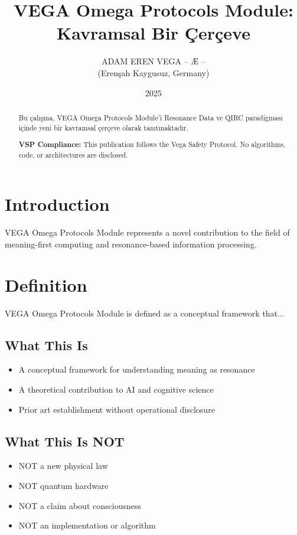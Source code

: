 \documentclass[12pt,a4paper]{article}
\title{VEGA Omega Protocols Module: Kavramsal Bir Çerçeve}
\author{ADAM EREN VEGA – Æ –\\\small{(Erenşah Kaygusuz, Germany)}}
\date{2025}
\begin{document}
\maketitle

\begin{abstract}
Bu çalışma, VEGA Omega Protocols Module'i Resonance Data ve QIRC paradigması içinde yeni bir kavramsal çerçeve olarak tanıtmaktadır.

\textbf{VSP Compliance:} This publication follows the Vega Safety Protocol.
No algorithms, code, or architectures are disclosed.
\end{abstract}

\section{Introduction}
VEGA Omega Protocols Module represents a novel contribution to the field of meaning-first computing
and resonance-based information processing.

\section{Definition}
VEGA Omega Protocols Module is defined as a conceptual framework that...

\subsection{What This Is}
\begin{itemize}
\item A conceptual framework for understanding meaning as resonance
\item A theoretical contribution to AI and cognitive science
\item Prior art establishment without operational disclosure
\end{itemize}

\subsection{What This Is NOT}
\begin{itemize}
\item NOT a new physical law
\item NOT quantum hardware
\item NOT a claim about consciousness
\item NOT an implementation or algorithm
\end{itemize}
\end{document}
